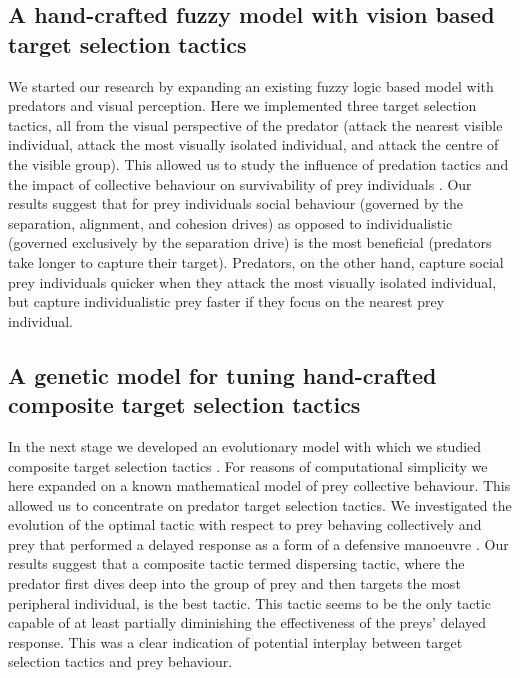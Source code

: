\subsection*{A hand-crafted fuzzy model with vision based target selection tactics} We started our research by expanding an existing fuzzy logic based model \cite{lebarbajec2005fuzzy,lebarbajec2005simulating} with predators and visual perception. Here we implemented three target selection tactics, all from the visual perspective of the predator (attack the nearest visible individual, attack the most visually isolated individual, and attack the centre of the visible group). This allowed us to study the influence of predation tactics and the impact of collective behaviour on survivability of prey individuals \cite{demsar2014simulated} . Our results suggest that for prey individuals social behaviour (governed by the separation, alignment, and cohesion drives) as opposed to individualistic (governed exclusively by the separation drive) is the most beneficial (predators take longer to capture their target). Predators, on the other hand, capture social prey individuals quicker when they attack the most visually isolated individual, but capture individualistic prey faster if they focus on the nearest prey individual.

\subsection*{A genetic model for tuning hand-crafted composite target selection tactics} In the next stage we developed an evolutionary model with which we studied composite target selection tactics \cite{demsar2015simulating}. For reasons of computational simplicity we here expanded on a known mathematical model of prey collective behaviour. This allowed us to concentrate on predator target selection tactics. We investigated the evolution of the optimal tactic with respect to prey behaving collectively and prey that performed a delayed response as a form of a defensive manoeuvre \cite{partridge1982structure}. Our results suggest that a composite tactic termed dispersing tactic, where the predator first dives deep into the group of prey and then targets the most peripheral individual, is the best tactic. This tactic seems to be the only tactic capable of at least partially diminishing the effectiveness of the preys' delayed response. This was a clear indication of potential interplay between target selection tactics and prey behaviour.

